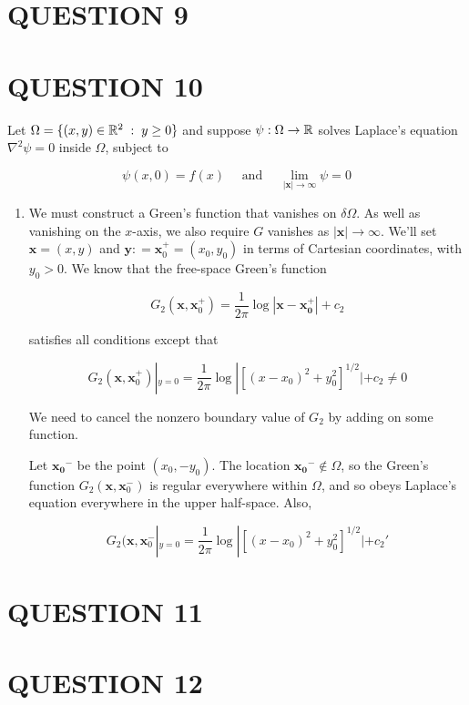 \documentclass[a4paper]{article}
\begin{document}
\section{QUESTION 9}
\section{QUESTION 10}

Let $ \Omega = \{  (x,y) \in \mathbb{R}^{2} \; : \; y \geq 0 \} $ and suppose $ \psi : \Omega \to \mathbb{R} $ solves Laplace's equation $ \nabla^{2} \psi = 0 $ inside $ \Omega $, subject to

\[ \psi(x,0) = f(x) \quad \text{ and } \quad \lim\limits_{| \mathbf{x} | \to \infty} \psi = 0 \]

\begin{enumerate}
	\item We must construct a Green's function that vanishes on $ \delta \Omega $. As well as vanishing on the $ x $-axis, we also require $ G $ vanishes as $ | \mathbf{x} | \to \infty $. We'll set $ \mathbf{x} = (x,y) $ and $ \mathbf{y} : = \mathbf{x}_{0}^{+} = (x_{0},y_{0}) $ in terms of Cartesian coordinates, with $ y_{0} > 0 $. We know that the free-space Green's function
	
	\[ G_{2}(\mathbf{x},\mathbf{x}_{0}^{+}) = \frac{1}{2\pi} \log |  \mathbf{x} - \mathbf{x_{0}^{+}} | + c_{2}  \]
	
	satisfies all conditions except that
	
		\[ G_{2}(\mathbf{x},\mathbf{x}_{0}^{+}) |_{y = 0} = \frac{1}{2\pi} \log | [ (x - x_{0})^{2} + y_{0}^{2} ]^{1/2} | + c_{2} \neq 0  \]
		
	We need to cancel the nonzero boundary value of $ G_{2} $ by adding on some function.
	
	Let $ \mathbf{x_{0}}^{-} $ be the point $ (x_{0},-y_{0}) $. The location $ \mathbf{x_{0}}^{-} \notin \Omega $, so the Green's function $ G_{2}(\mathbf{x},\mathbf{x}_{0}^{-}) $ is regular everywhere within $ \Omega $, and so obeys Laplace's equation everywhere in the upper half-space. Also,
	
	\[ G_{2}(\mathbf{x},\mathbf{x}_{0}^{-} |_{y = 0} = \frac{1}{2\pi} \log | [ (x - x_{0})^{2} + y_{0}^{2} ]^{1/2} | + c_{2}'  \]
	

	
\end{enumerate}




\section{QUESTION 11}
\section{QUESTION 12}
\end{document}
